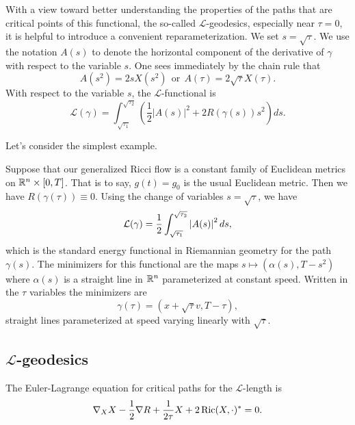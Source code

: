 With a view toward better understanding the properties of the paths
that are critical points of this functional, the so-called
$\mathcal{L}$-geodesics, especially near $\tau=0$, it is helpful to
introduce a convenient reparameterization. We set $s=\sqrt{\tau}$.
We use the notation $A(s)$ to denote the horizontal component of the
derivative of $\gamma$ with respect to the variable $s$. One sees
immediately by the chain rule that
\begin{equation}\label{changeofvar}
A(s^2) = 2s X(s^2)\ \ \text{or} \ \
A(\tau)=2\sqrt{\tau}X(\tau).\end{equation} With respect to the
variable $s$, the ${\mathcal L}$-functional is
\begin{equation}\label{seqn}
\mathcal{L}(\gamma)=
\int_{\sqrt{\tau_1}}^{\sqrt{\tau_2}}\left(\frac{1}{2}|A(s)|^{2} +
2R(\gamma(s))s^{2}\right)ds.
\end{equation}

Let's consider the simplest example.

\begin{example}\label{ex:l-length-euclidean}
\uses{def:l-length}

Suppose that our generalized Ricci flow is a constant family of
Euclidean metrics on $\mathbb{R}^n\times [0,T]$. That is to say, $g(t) =
g_{0}$ is the usual Euclidean metric. Then we have
$R(\gamma(\tau))\equiv 0$. Using the change of variables
$s=\sqrt{\tau}$, we have
$$\mathcal{L}(\gamma) = \frac{1}{2}\int_{\sqrt{\tau_1}}^{\sqrt{\tau_2}} \left\vert A(s)\right\vert^{2}ds,
$$ which is the standard energy functional in Riemannian geometry
for the path $\gamma(s)$. The minimizers for this functional are the
maps $s\mapsto (\alpha(s),T-s^2)$ where $\alpha(s)$ is a straight
line in $\mathbb{R}^n$ parameterized at constant speed. Written in the
$\tau$ variables the minimizers are
$$\gamma(\tau)=(x+\sqrt{\tau}v,T-\tau),$$
straight lines parameterized at speed varying linearly with
$\sqrt{\tau}$.

\end{example}

\subsection{${\mathcal L}$-geodesics}

\begin{lemma}\label{lem:l-length-euler-lagrange}
\uses{def:l-length}
\label{EL}

The
Euler-Lagrange equation for critical paths for the $\mathcal{L}$-length is
\begin{equation}\label{EulerLag}
 \nabla_{X}X - \frac{1}{2}\nabla R
+ \frac{1}{2\tau}X + 2\operatorname{Ric}(X,\cdot)^* = 0.
\end{equation}
\end{lemma}


